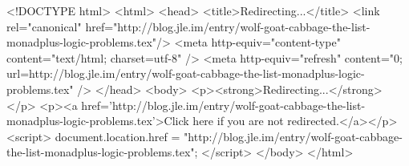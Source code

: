 <!DOCTYPE html>
<html>
<head>
<title>Redirecting...</title>
<link rel="canonical" href="http://blog.jle.im/entry/wolf-goat-cabbage-the-list-monadplus-logic-problems.tex"/>
<meta http-equiv="content-type" content="text/html; charset=utf-8" />
<meta http-equiv="refresh" content="0; url=http://blog.jle.im/entry/wolf-goat-cabbage-the-list-monadplus-logic-problems.tex" />
</head>
<body>
  <p><strong>Redirecting...</strong></p>
  <p><a href='http://blog.jle.im/entry/wolf-goat-cabbage-the-list-monadplus-logic-problems.tex'>Click here if you are not redirected.</a></p>
  <script>
    document.location.href = "http://blog.jle.im/entry/wolf-goat-cabbage-the-list-monadplus-logic-problems.tex";
  </script>
</body>
</html>
